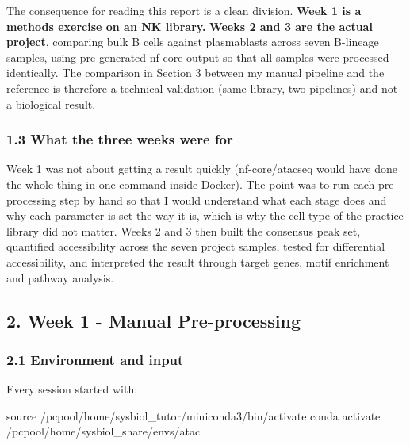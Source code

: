 \documentclass[
  11pt,
  a4paper,
]{article}
\newenvironment{Shaded}{}{}
\newcommand{\BuiltInTok}[1]{\textcolor[rgb]{0.00,0.50,0.00}{#1}}
\newcommand{\ExtensionTok}[1]{#1}
\newcommand{\NormalTok}[1]{#1}
\begin{document}
The consequence for reading this report is a clean division.
\textbf{Week 1 is a methods exercise on an NK library.} \textbf{Weeks 2
and 3 are the actual project}, comparing bulk B cells against
plasmablasts across seven B-lineage samples, using pre-generated nf-core
output so that all samples were processed identically. The comparison in
Section 3 between my manual pipeline and the reference is therefore a
technical validation (same library, two pipelines) and not a biological
result.

\hypertarget{what-the-three-weeks-were-for}{%
\subsubsection{1.3 What the three weeks were
for}\label{what-the-three-weeks-were-for}}

Week 1 was not about getting a result quickly (nf-core/atacseq would
have done the whole thing in one command inside Docker). The point was
to run each pre-processing step by hand so that I would understand what
each stage does and why each parameter is set the way it is, which is
why the cell type of the practice library did not matter. Weeks 2 and 3
then built the consensus peak set, quantified accessibility across the
seven project samples, tested for differential accessibility, and
interpreted the result through target genes, motif enrichment and
pathway analysis.

\hypertarget{week-1---manual-pre-processing}{%
\subsection{2. Week 1 - Manual
Pre-processing}\label{week-1---manual-pre-processing}}

\hypertarget{environment-and-input}{%
\subsubsection{2.1 Environment and input}\label{environment-and-input}}

Every session started with:

\begin{Shaded}
\begin{Highlighting}[]
\BuiltInTok{source}\NormalTok{ /pcpool/home/sysbiol\_tutor/miniconda3/bin/activate}
\ExtensionTok{conda}\NormalTok{ activate /pcpool/home/sysbiol\_share/envs/atac}
\end{Highlighting}
\end{Shaded}
\end{document}

